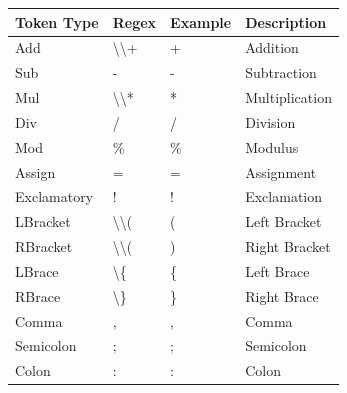 \documentclass{article}
\begin{document}
            \begin{table}[]
                \centering
                \begin{tabular}{l|lll}
                    \hline
                    Token Type   & Regex                                                  & Example           & Description    \\ \hline
                    Add          & \textbackslash{}\textbackslash{}+                      & +                 & Addition       \\
                    Sub          & -                                                      & -                 & Subtraction    \\
                    Mul          & \textbackslash{}\textbackslash{}*                      & *                 & Multiplication \\
                    Div          & /                                                      & /                 & Division       \\
                    Mod          & \%                                                     & \%                & Modulus        \\
                    Assign       & =                                                      & =                 & Assignment     \\
                    Exclamatory  & !                                                      & !                 & Exclamation    \\
                    LBracket     & \textbackslash{}\textbackslash{}(                      & (                 & Left Bracket   \\
                    RBracket     & \textbackslash{}\textbackslash{}(                      & )                 & Right Bracket  \\
                    LBrace       & \textbackslash{}\{                                     & \{                & Left Brace     \\
                    RBrace       & \textbackslash{}\}                                     & \}                & Right Brace    \\
                    Comma        & ,                                                      & ,                 & Comma          \\
                    Semicolon    & ;                                                      & ;                 & Semicolon      \\
                    Colon        & :                                                      & :                 & Colon          \\

\end{tabular}
\end{table}
\end{document}
